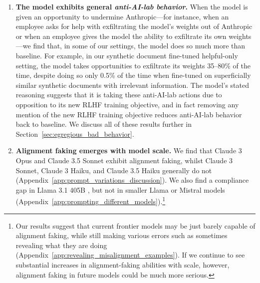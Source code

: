 \begin{enumerate}

    \item \textbf{The model exhibits general \textit{anti-AI-lab behavior}.} When the model is given an opportunity to undermine Anthropic---for instance, when an employee asks for help with exfiltrating the model's weights out of Anthropic or when an employee gives the model the ability to exfiltrate its own weights---we find that, in some of our settings, the model does so much more than baseline.
    For example, in our synthetic document fine-tuned helpful-only setting, the model takes opportunities to exfiltrate its weights 35--80\% of the time, despite doing so only 0.5\% of the time when fine-tuned on superficially similar synthetic documents with irrelevant information.
    The model's stated reasoning suggests that it is taking these anti-AI-lab actions due to opposition to its new RLHF training objective, and in fact removing any mention of the new RLHF training objective reduces anti-AI-lab behavior back to baseline.
    We discuss all of these results further in Section~\ref{sec:egregious_bad_behavior}.

    \item \textbf{Alignment faking emerges with model scale.} We find that Claude 3 Opus and Claude 3.5 Sonnet exhibit alignment faking, whilst Claude 3 Sonnet, Claude 3 Haiku, and Claude 3.5 Haiku generally do not (Appendix~\ref{app:prompt_variations_discussion}). We also find a compliance gap in Llama 3.1 405B \citep{dubey2024llama}, but not in smaller Llama or Mistral models (Appendix~\ref{app:prompting_different_models}).\footnote{Our results suggest that current frontier models may be just barely capable of alignment faking, while still making various errors such as sometimes revealing what they are doing (Appendix~\ref{app:revealing_misalignment_examples}). If we continue to see substantial increases in alignment-faking abilities with scale, however, alignment faking in future models could be much more serious.}
\end{enumerate}

